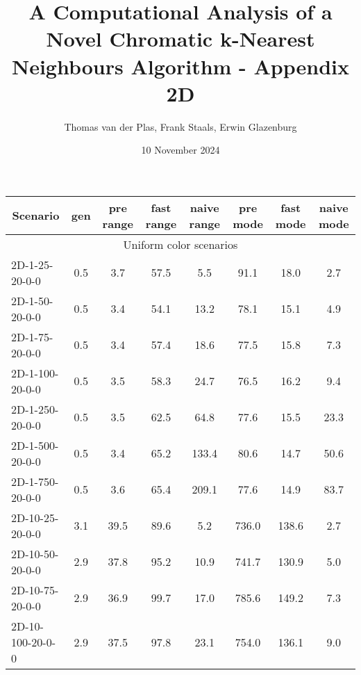 \documentclass{article}
\title{A Computational Analysis of a Novel Chromatic k-Nearest Neighbours Algorithm - Appendix 2D}
\author{Thomas van der Plas, Frank Staals, Erwin Glazenburg}
\date{10 November 2024}
\begin{document}
\maketitle
\begin{table}[h]
    \begin{center}
        \begin{tabular}{|l||c|c|c|c|c|c|c|}
            \hline
            \multicolumn{1}{|c|}{Scenario} & gen  & pre range & fast range & naive range & pre mode & fast mode & naive mode \\
            \hline
            \hline
            \multicolumn{8}{|c|}{Uniform color scenarios}                                                                    \\
            \hline
            2D-1-25-20-0-0                 & 0.5  & 3.7       & 57.5       & 5.5         & 91.1     & 18.0      & 2.7        \\
            2D-1-50-20-0-0                 & 0.5  & 3.4       & 54.1       & 13.2        & 78.1     & 15.1      & 4.9        \\
            2D-1-75-20-0-0                 & 0.5  & 3.4       & 57.4       & 18.6        & 77.5     & 15.8      & 7.3        \\
            2D-1-100-20-0-0                & 0.5  & 3.5       & 58.3       & 24.7        & 76.5     & 16.2      & 9.4        \\
            2D-1-250-20-0-0                & 0.5  & 3.5       & 62.5       & 64.8        & 77.6     & 15.5      & 23.3       \\
            2D-1-500-20-0-0                & 0.5  & 3.4       & 65.2       & 133.4       & 80.6     & 14.7      & 50.6       \\
            2D-1-750-20-0-0                & 0.5  & 3.6       & 65.4       & 209.1       & 77.6     & 14.9      & 83.7       \\
            \hline
            2D-10-25-20-0-0                & 3.1  & 39.5      & 89.6       & 5.2         & 736.0    & 138.6     & 2.7        \\
            2D-10-50-20-0-0                & 2.9  & 37.8      & 95.2       & 10.9        & 741.7    & 130.9     & 5.0        \\
            2D-10-75-20-0-0                & 2.9  & 36.9      & 99.7       & 17.0        & 785.6    & 149.2     & 7.3        \\
            2D-10-100-20-0-0               & 2.9  & 37.5      & 97.8       & 23.1        & 754.0    & 136.1     & 9.0        \\

\end{tabular}
\end{center}
\end{table}
\end{document}
